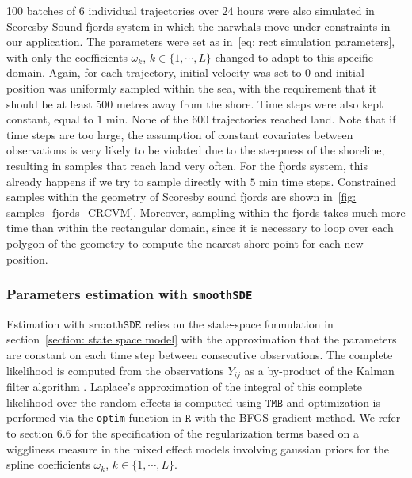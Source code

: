 \documentclass[11pt]{article}
\newcommand {\1}{\mathbb{1}}
\begin{document}
100 batches of 6 individual trajectories over $24$ hours were also simulated in Scoresby Sound fjords system in which the narwhals move under constraints in our application. The parameters were set as in~\ref{eq: rect simulation parameters}, with only the coefficients $\omega_k$, $k \in \{1,\cdots,L\}$ changed to adapt to this specific domain.
Again, for each trajectory, initial velocity was set to $0$ and initial position was uniformly sampled within the sea, with the requirement that it should be at least $500$ metres away from the shore. Time steps were also kept constant, equal to $1$ min. None of the $600$ trajectories reached land. Note that if time steps are too large, the assumption of constant covariates between observations is very likely to be violated due to the steepness of the shoreline, resulting in samples that reach land very often. For the fjords system, this already happens if we try to sample directly with $5$ min time steps. Constrained samples within the geometry of Scoresby sound fjords are shown in~\ref{fig: samples_fjords_CRCVM}. Moreover, sampling within the fjords takes much more time than within the rectangular domain, since it is necessary to loop over each polygon of the geometry to compute the nearest shore point for each new position. 



\subsubsection{Parameters estimation with \texttt{smoothSDE}}

Estimation with $\texttt{smoothSDE}$ relies on the state-space formulation in section~\ref{section: state space model} with the approximation that the parameters are constant on each time step between consecutive observations.
The complete likelihood is computed from the observations $Y_{ij}$ as a by-product of the Kalman filter algorithm \cite{michelot_varying-coefficient_2021}.
Laplace's approximation of the integral of this complete likelihood over the random effects is computed using $\texttt{TMB}$ \cite{kristensen_tmb_2016} and optimization is performed via the \texttt{optim} function in $\texttt{R}$ with the BFGS gradient method. We refer to \cite{wood_generalized_2017} section $6.6$ for the specification of the regularization terms based on a wiggliness measure in the mixed effect models involving gaussian priors for the spline coefficients $\omega_k$, $k \in \{1,\cdots,L\}$. \\
\end{document}
